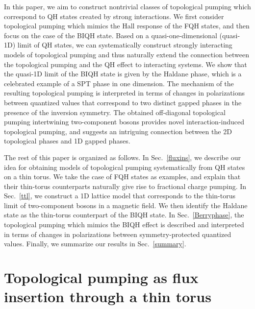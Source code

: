 \documentclass[aps,prb,twocolumn,superscriptaddress,showpacs,floatfix]{revtex4-1}
\begin{document}
In this paper, we aim to construct nontrivial classes of topological pumping which correspond to QH states created by strong interactions. We first consider topological pumping which mimics the Hall response of the FQH states, and then focus on the case of the BIQH state. Based on a quasi-one-dimensional (quasi-1D) limit of QH states,\cite{TaoThouless, Seidel, Bergholtz1, Bergholtz2} we can systematically construct strongly interacting models of topological pumping and thus naturally extend the connection between the topological pumping and the QH effect to interacting systems. We show that the quasi-1D limit of the BIQH state is given by the Haldane phase,\cite{HaldanePhysLett, Haldane, AKLT1, AKLT2} which is a celebrated example of a SPT phase in one dimension.\cite{GuWen, Pollmann1, Pollmann2} The mechanism of the resulting topological pumping is interpreted in terms of changes in polarizations between quantized values that correspond to two distinct gapped phases in the presence of the inversion symmetry. The obtained 
off-diagonal topological pumping intertwining two-component bosons provides novel interaction-induced topological pumping, and suggests an intriguing connection between the 2D topological phases and 1D gapped phases. 

The rest of this paper is organized as follows. In Sec.\ \ref{fluxins}, we describe our idea for obtaining models of topological pumping 
systematically from QH states on a thin torus. We take the case of FQH states as examples, and explain that their thin-torus counterparts naturally give rise to fractional charge pumping. In Sec.\ \ref{ttl}, we construct a 1D lattice model that corresponds to the thin-torus limit of two-component bosons in a magnetic field. We then identify the Haldane state as the thin-torus counterpart of the BIQH state. In Sec.\ \ref{Berryphase}, the topological pumping which mimics the BIQH effect is described and interpreted in terms of changes in polarizations between symmetry-protected quantized values. Finally, we summarize our results in Sec.\ \ref{summary}.

\section{Topological pumping as flux insertion through a thin torus\label{fluxins}}
\end{document}
